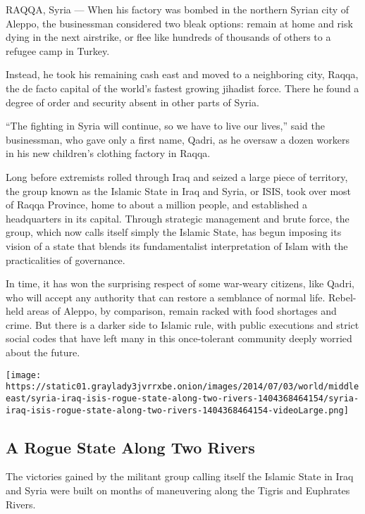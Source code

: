 RAQQA, Syria --- When his factory was bombed in the northern Syrian city
of Aleppo, the businessman considered two bleak options: remain at home
and risk dying in the next airstrike, or flee like hundreds of thousands
of others to a refugee camp in Turkey.

Instead, he took his remaining cash east and moved to a neighboring
city, Raqqa, the de facto capital of the world's fastest growing
jihadist force. There he found a degree of order and security absent in
other parts of Syria.

``The fighting in Syria will continue, so we have to live our lives,''
said the businessman, who gave only a first name, Qadri, as he oversaw a
dozen workers in his new children's clothing factory in Raqqa.

Long before extremists rolled through Iraq and seized a large piece of
territory, the group known as the Islamic State in Iraq and Syria, or
ISIS, took over most of Raqqa Province, home to about a million people,
and established a headquarters in its capital. Through strategic
management and brute force, the group, which now calls itself simply the
Islamic State, has begun imposing its vision of a state that blends its
fundamentalist interpretation of Islam with the practicalities of
governance.

In time, it has won the surprising respect of some war-weary citizens,
like Qadri, who will accept any authority that can restore a semblance
of normal life. Rebel-held areas of Aleppo, by comparison, remain racked
with food shortages and crime. But there is a darker side to Islamic
rule, with public executions and strict social codes that have left many
in this once-tolerant community deeply worried about the future.

\href{https://www.nytimes3xbfgragh.onion/interactive/2014/07/03/world/middleeast/syria-iraq-isis-rogue-state-along-two-rivers.html}{}

\texttt{[image: https://static01.graylady3jvrrxbe.onion/images/2014/07/03/world/middleeast/syria-iraq-isis-rogue-state-along-two-rivers-1404368464154/syria-iraq-isis-rogue-state-along-two-rivers-1404368464154-videoLarge.png]}

\hypertarget{a-rogue-state-along-two-rivers}{%
\subsection{A Rogue State Along Two
Rivers}\label{a-rogue-state-along-two-rivers}}

The victories gained by the militant group calling itself the Islamic
State in Iraq and Syria were built on months of maneuvering along the
Tigris and Euphrates Rivers.

